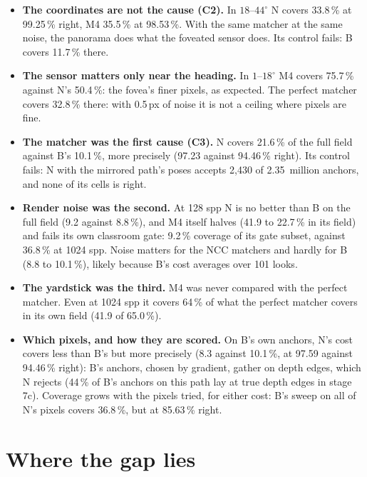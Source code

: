 \documentclass[11pt,a4paper]{article}
\begin{document}
\begin{itemize}
\item \textbf{The coordinates are not the cause (C2).} In $18$--$44^\circ$ N covers 33.8\,\% at 99.25\,\% right, M4 35.5\,\%
  at 98.53\,\%. With the same matcher at the same noise, the panorama does what the foveated sensor does. Its control
  fails: B covers 11.7\,\% there.
\item \textbf{The sensor matters only near the heading.} In $1$--$18^\circ$ M4 covers 75.7\,\% against N's 50.4\,\%: the
  fovea's finer pixels, as expected. The perfect matcher covers 32.8\,\% there: with 0.5\,px of noise it is not a ceiling
  where pixels are fine.
\item \textbf{The matcher was the first cause (C3).} N covers 21.6\,\% of the full field against B's 10.1\,\%, more
  precisely (97.23 against 94.46\,\% right). Its control fails: N with the mirrored path's poses accepts 2,430 of
  2.35~million anchors, and none of its cells is right.
\item \textbf{Render noise was the second.} At 128 spp N is no better than B on the full field (9.2 against 8.8\,\%), and M4
  itself halves (41.9 to 22.7\,\% in its field) and fails its own classroom gate: 9.2\,\% coverage of its gate subset,
  against 36.8\,\% at 1024 spp. Noise matters for the NCC matchers and hardly for B (8.8 to 10.1\,\%), likely because
  B's cost averages over 101 looks.
\item \textbf{The yardstick was the third.} M4 was never compared with the perfect matcher. Even at 1024 spp it covers
  64\,\% of what the perfect matcher covers in its own field (41.9 of 65.0\,\%).
\item \textbf{Which pixels, and how they are scored.} On B's own anchors, N's cost covers less than B's but more precisely
  (8.3 against 10.1\,\%, at 97.59 against 94.46\,\% right): B's anchors, chosen by gradient, gather on depth edges, which N
  rejects (44\,\% of B's anchors on this path lay at true depth edges in stage 7c). Coverage grows with the pixels tried, for either cost: B's sweep on all of N's pixels covers 36.8\,\%, but at
  85.63\,\% right.
\end{itemize}

\section{Where the gap lies}\label{sec:where}
\end{document}
